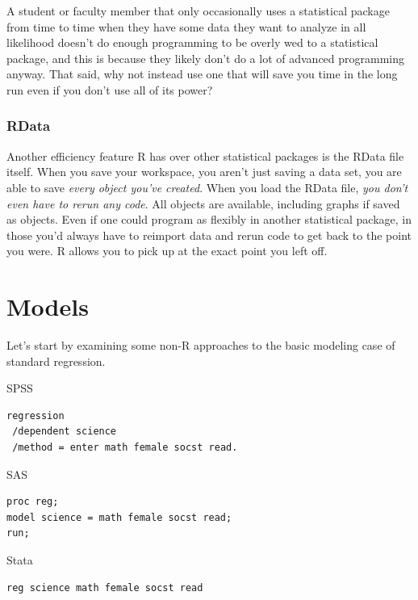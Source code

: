 \documentclass[english,nohyper,titlepage]{tufte-handout}\usepackage[]{graphicx}\usepackage[]{color}
\begin{document}
A student or faculty member that only occasionally uses a statistical package from time to time when they have some data they want to analyze in all likelihood doesn't do enough programming to be overly wed to a statistical package, and this is because they likely don't do a lot of advanced programming anyway.  That said, why not instead use one that will save you time in the long run even if you don't use all of its power?

\section{RData}
Another efficiency feature R has over other statistical packages is the RData file itself.  When you save your workspace, you aren't just saving a data set, you are able to save \emph{every object you've created}.  When you load the RData file, \emph{you don't even have to rerun any code}. All objects are available, including graphs if saved as objects.  Even if one could program as flexibly in another statistical package, in those you'd always have to reimport data and rerun code to get back to the point you were. R allows you to pick up at the exact point you left off.





\part{Models}

Let's start by examining some non-R approaches to the basic modeling case of standard regression.
\bigskip

\noindent SPSS
\begin{footnotesize}
\begin{verbatim}
regression
 /dependent science
 /method = enter math female socst read.
\end{verbatim}
\end{footnotesize}

\noindent SAS
\begin{footnotesize}
\begin{verbatim}
proc reg;
model science = math female socst read;
run;
\end{verbatim}
\end{footnotesize}

\noindent Stata
\begin{footnotesize}
\begin{verbatim}
reg science math female socst read
\end{verbatim}
\end{footnotesize}
\end{document}
